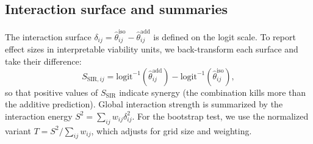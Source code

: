 \documentclass[pdflatex,sn-nature]{sn-jnl}%
\begin{document}
\subsection{Interaction surface and summaries}
The interaction surface $\delta_{ij}=\hat\theta^{\mathrm{iso}}_{ij}-\hat\theta^{\mathrm{add}}_{ij}$ is defined on the logit scale.
To report effect sizes in interpretable viability units, we back-transform each surface and take their difference:
\begin{equation}
S_{\mathrm{SIR},ij}=\mathrm{logit}^{-1}(\hat\theta^{\mathrm{add}}_{ij})-\mathrm{logit}^{-1}(\hat\theta^{\mathrm{iso}}_{ij}),
\end{equation}
so that positive values of $S_{\mathrm{SIR}}$ indicate synergy (the combination kills more than the additive prediction).
Global interaction strength is summarized by the interaction energy $S^2=\sum_{ij} w_{ij}\delta_{ij}^2$.
For the bootstrap test, we use the normalized variant $T=S^2/\sum_{ij} w_{ij}$, which adjusts for grid size and weighting.
\end{document}
